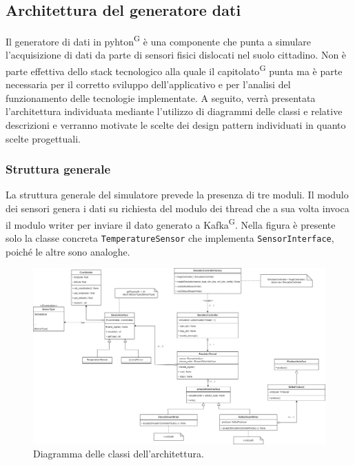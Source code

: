 \documentclass[8pt]{article}
\newcommand{\glossterm}[1]{#1\textsuperscript{G}} %
\begin{document}
\subsection{Architettura del generatore dati}
Il generatore di dati in \glossterm{pyhton} è una componente che punta a simulare l'acquisizione di dati da parte di sensori fisici dislocati nel suolo cittadino. Non è parte effettiva dello stack tecnologico alla quale il \glossterm{capitolato} punta ma è parte necessaria per il corretto sviluppo dell'applicativo e per l'analisi del funzionamento delle tecnologie implementate. A seguito, verrà presentata l’architettura individuata mediante l’utilizzo di diagrammi delle classi e relative descrizioni e verranno motivate le scelte dei design pattern individuati in quanto scelte progettuali.
\subsubsection{Struttura generale}
La struttura generale del simulatore prevede la presenza di tre moduli. Il modulo dei sensori genera i dati su richiesta del modulo dei thread che a sua volta invoca il modulo writer per inviare il dato generato a \glossterm{Kafka}.
Nella figura è presente solo la classe concreta \verb|TemperatureSensor| che implementa \verb|SensorInterface|, poiché le altre sono analoghe.
\begin{figure}[h!]
    \centering
    \includegraphics[width=1\textwidth]{images_st/overview.png}
    \caption{Diagramma delle classi dell'architettura.}
    \label{fig:Diagramma delle classi dell'architettura}
\end{figure}
\clearpage
\end{document}

